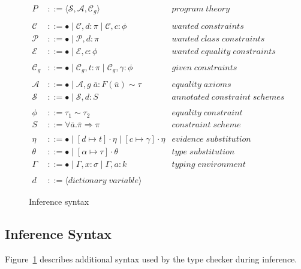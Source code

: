 \begin{figure}
\begin{align*}
    P &::= \langle \mathcal{S}, \mathcal{A}, \mathcal{C}_g \rangle &program \;
    theory
    \\
    \\
    \mathcal{C} &::= \bullet \mid \mathcal{C}, d : \pi \mid \mathcal{C}, c
    : \phi &wanted \; constraints
    \\
    \mathcal{P} &::= \bullet \mid \mathcal{P}, d : \pi &wanted \; class \;
    constraints
    \\
    \mathcal{E} &::= \bullet \mid \mathcal{E}, c : \phi &wanted \; equality
    \; constraints
    \\
    \\
    \mathcal{C}_g &::= \bullet \mid \mathcal{C}_g, t : \pi \mid \mathcal{C}_g,
    \gamma: \phi &given \; constraints
    \\
    \\
    \mathcal{A} &::= \bullet \mid \mathcal{A}, g \; \overline{a} :
    F(\overline{u}) \sim \tau &equality \; axioms
    \\
    \mathcal{S} &::= \bullet \mid \mathcal{S}, d : S &annotated \; constraint \;
    schemes
    \\ 
    \\
    \phi &::= \tau_1 \sim \tau_2 &equality \; constraint
    \\
    S &::= \forall \overline{a}. \overline{\pi} \Rightarrow \pi &constraint \;
    scheme
    \\
    \\
    \eta &::= \bullet \mid [d \mapsto t] \cdot \eta \mid [c \mapsto \gamma]
    \cdot \eta &evidence \; substitution
    \\
    \theta &::= \bullet \mid [\alpha \mapsto \tau] \cdot \theta &type \;
    substitution
    \\
    \Gamma &::= \bullet \mid \Gamma, x : \sigma \mid \Gamma, a : k &typing \; environment
    \\
    \\
    d &::= \langle dictionary \; variable \rangle
\end{align*}
\caption{Inference syntax}
\label{fig:inference-syntax}
\end{figure}
\subsection{Inference Syntax}
Figure~\ref{fig:inference-syntax} describes additional syntax used by the type
checker during inference.

